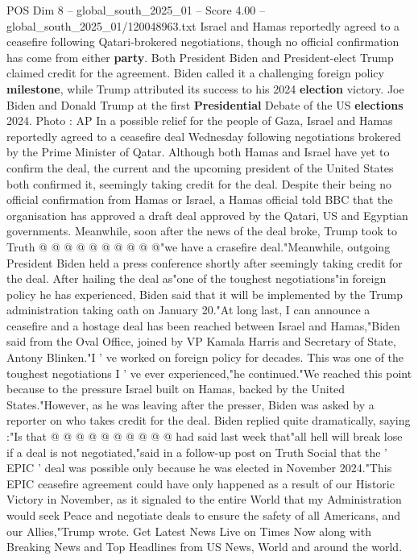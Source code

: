\begin{textsample}{POS Dim 8 – global\_south\_2025\_01 – Score 4.00 – global\_south\_2025\_01/120048963.txt}  \label{ex:f8_pos_328}
Israel and Hamas reportedly agreed to a ceasefire following Qatari-brokered negotiations, though no official confirmation has come from either \textbf{party}.
Both President Biden and President-elect Trump claimed credit for the agreement.
Biden called it a challenging foreign policy \textbf{milestone}, while Trump attributed its success to his 2024 \textbf{election} victory.
Joe Biden and Donald Trump at the first \textbf{Presidential} Debate of the US \textbf{elections} 2024.
Photo : AP In a possible relief for the people of Gaza, Israel and Hamas reportedly agreed to a ceasefire deal Wednesday following negotiations brokered by the Prime Minister of Qatar.
Although both Hamas and Israel have yet to confirm the deal, the current and the upcoming president of the United States both confirmed it, seemingly taking credit for the deal.
Despite their being no official confirmation from Hamas or Israel, a Hamas official told BBC that the organisation has approved a draft deal approved by the Qatari, US and Egyptian governments.
Meanwhile, soon after the news of the deal broke, Trump took to Truth @ @ @ @ @ @ @ @ @ @"we have a crasefire deal."Meanwhile, outgoing President Biden held a press conference shortly after seemingly taking credit for the deal.
After hailing the deal as"one of the toughest negotiations"in foreign policy he has experienced, Biden said that it will be implemented by the Trump administration taking oath on January 20."At long last, I can announce a ceasefire and a hostage deal has been reached between Israel and Hamas,"Biden said from the Oval Office, joined by VP Kamala Harris and Secretary of State, Antony Blinken."I ' ve worked on foreign policy for decades.
This was one of the toughest negotiations I ' ve ever experienced,"he continued."We reached this point because to the pressure Israel built on Hamas, backed by the United States."However, as he was leaving after the presser, Biden was asked by a reporter on who takes credit for the deal.
Biden replied quite dramatically, saying :"Is that @ @ @ @ @ @ @ @ @ @ had said last week that"all hell will break lose if a deal is not negotiated,"said in a follow-up post on Truth Social that the ' EPIC ' deal was possible only because he was elected in November 2024."This EPIC ceasefire agreement could have only happened as a result of our Historic Victory in November, as it signaled to the entire World that my Administration would seek Peace and negotiate deals to ensure the safety of all Americans, and our Allies,"Trump wrote.
Get Latest News Live on Times Now along with Breaking News and Top Headlines from US News, World and around the world.

\end{textsample}
